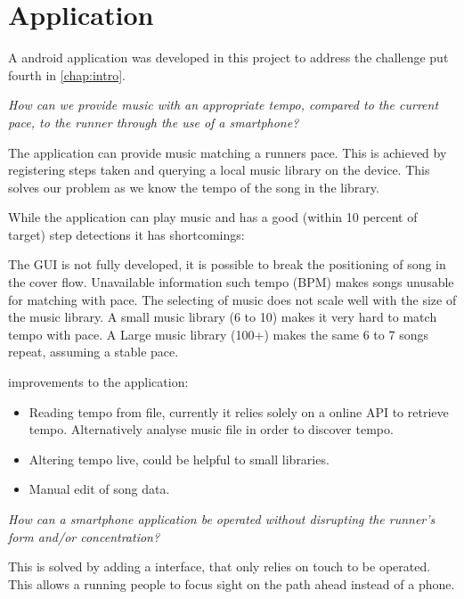 \section{Application}
A android application was developed in this project to address the challenge put fourth in \cref{chap:intro}.

\begin{center}
\textit{How can we provide music with an appropriate tempo, compared to the current pace, to the runner through the use of a smartphone?}
\end{center}
The application can provide music matching a runners pace. This is achieved by registering steps taken and querying a local music library on the device. This solves our problem as we know the tempo of the song in the library.

While the application can play music and has a good (within 10 percent of target) step detections it has shortcomings: 

The GUI is not fully developed, it is possible to break the positioning of song in the cover flow. Unavailable information such tempo (BPM) makes songs unusable for matching with pace. The selecting of music does not scale well with the size of the music library. A small music library (6 to 10) makes it very hard to match tempo with pace. A Large music library (100+) makes the same 6 to 7 songs repeat, assuming a stable pace.

improvements to the application:
\begin{itemize}
\item Reading tempo from file, currently it relies solely on a online API to retrieve tempo.
\subitem Alternatively analyse music file in order to discover tempo.
\item Altering tempo live, could be helpful to small libraries.
\item Manual edit of song data.
\end{itemize}


\begin{center}
\textit{How can a smartphone application be operated without disrupting the runner's form and/or concentration?}
\end{center}
This is solved by adding a interface, that only relies on touch to be operated. This allows a running people to focus sight on the path ahead instead of a phone. 






